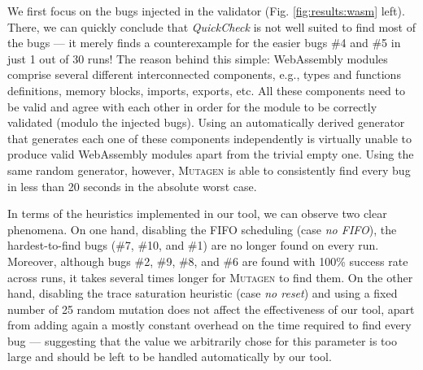 \documentclass[sigconf, anonymous, review]{acmart}
\newcommand{\quickcheck}{\textit{QuickCheck}\xspace}
\newcommand{\mutagen}{\textsc{Mutagen}\xspace}
\begin{document}
We first focus on the bugs injected in the validator (Fig.
\ref{fig:results:wasm} left).
%
There, we can quickly conclude that \quickcheck is not well suited to find most
of the bugs --- it merely finds a counterexample for the easier bugs \#4 and \#5
in just 1 out of 30 runs!
%
The reason behind this simple: WebAssembly modules comprise several different
interconnected components, e.g., types and functions definitions, memory blocks,
imports, exports, etc.
%
All these components need to be valid and agree with each other in order for the
module to be correctly validated (modulo the injected bugs).
%
Using an automatically derived generator that generates each one of these
components independently is virtually unable to produce valid WebAssembly
modules apart from the trivial empty one.
%
Using the same random generator, however, \mutagen is able to consistently find
every bug in less than 20 seconds in the absolute worst case.


In terms of the heuristics implemented in our tool, we can observe two clear
phenomena.
%
On one hand, disabling the FIFO scheduling (case \textit{no FIFO}), the
hardest-to-find bugs (\#7, \#10, and \#1) are no longer found on every run.
%
Moreover, although bugs \#2, \#9, \#8, and \#6 are found with 100\% success rate
across runs, it takes several times longer for \mutagen to find them.
%
On the other hand, disabling the trace saturation heuristic (case \textit{no
  reset}) and using a fixed number of 25 random mutation does not affect the
effectiveness of our tool, apart from adding again a mostly constant overhead on
the time required to find every bug --- suggesting that the value we arbitrarily
chose for this parameter is too large and should be left to be handled
automatically by our tool.
\end{document}
